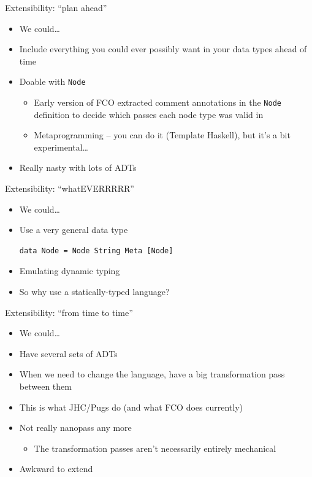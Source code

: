 \documentclass[adam,pdf,slideColor]{prosper}
\begin{document}
\begin{slide}{Extensibility: ``plan ahead''}
\begin{itemize}
\item We could\ldots
\item Include everything you could ever possibly want in your data
  types ahead of time
\item Doable with \verb|Node|
\begin{itemize}
\item Early version of FCO extracted comment annotations in
  the \verb|Node| definition to decide which passes each node type was
  valid in
\item Metaprogramming -- you can do it (Template Haskell), but it's a
  bit experimental\ldots
\end{itemize}
\item Really nasty with lots of ADTs
\end{itemize}
\end{slide}

\begin{slide}{Extensibility: ``whatEVERRRRR''}
\begin{itemize}
\item We could\ldots
\item Use a very general data type
\begin{verbatim}
data Node = Node String Meta [Node]
\end{verbatim}
\item Emulating dynamic typing
\item So why use a statically-typed language?
\end{itemize}
\end{slide}

\begin{slide}{Extensibility: ``from time to time''}
\begin{itemize}
\item We could\ldots
\item Have several sets of ADTs
\item When we need to change the language, have a big transformation
  pass between them
\item This is what JHC/Pugs do (and what FCO does currently)
\item Not really nanopass any more
\begin{itemize}
\item The transformation passes aren't necessarily entirely mechanical
\end{itemize}
\item Awkward to extend
\end{itemize}
\end{slide}
\end{document}

